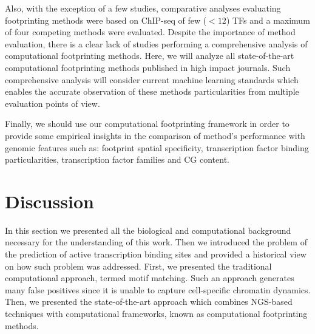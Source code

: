 Also, with the exception of a few studies, comparative analyses evaluating footprinting methods were based on ChIP-seq of few ($< 12$) TFs and a maximum of four competing methods were evaluated. Despite the importance of method evaluation, there is a clear lack of studies performing a comprehensive analysis of computational footprinting methods. Here, we will analyze all state-of-the-art computational footprinting methods published in high impact journals. Such comprehensive analysis will consider current machine learning standards which enables the accurate observation of these methods particularities from multiple evaluation points of view.

Finally, we should use our computational footprinting framework in order to provide some empirical insights in the comparison of method's performance with genomic features such as: footprint spatial specificity, transcription factor binding particularities, transcription factor families and CG content.

\section{Discussion}
\label{sec:discussion.2}

In this section we presented all the biological and computational background necessary for the understanding of this work. Then we introduced the problem of the prediction of active transcription binding sites and provided a historical view on how such problem was addressed. First, we presented the traditional computational approach, termed motif matching. Such an approach generates many false positives since it is unable to capture cell-specific chromatin dynamics. Then, we presented the state-of-the-art approach which combines NGS-based techniques with computational frameworks, known as computational footprinting methods.


